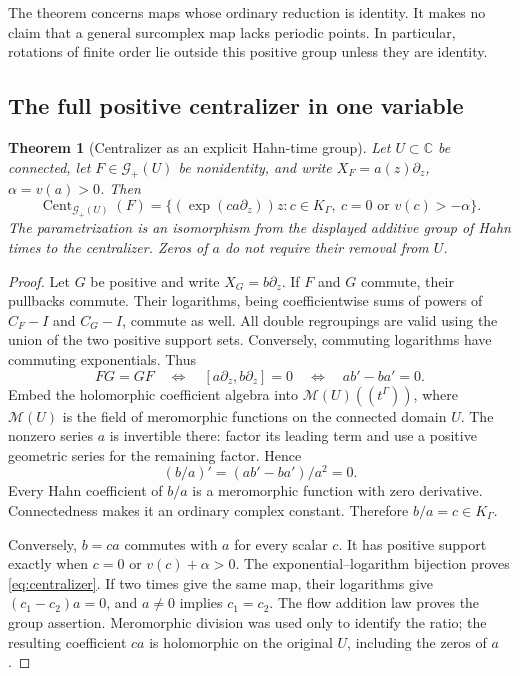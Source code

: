 \documentclass[11pt,letterpaper]{article}
\newtheorem{theorem}{Theorem}[section]
\theoremstyle{definition}
\theoremstyle{remark}
\newcommand{\C}{\mathbb C}
\newcommand{\GG}{\mathscr G}
\newcommand{\Cent}{\operatorname{Cent}}
\numberwithin{equation}{section}
\begin{document}
The theorem concerns maps whose ordinary reduction is identity. It makes no
claim that a general surcomplex map lacks periodic points. In particular,
rotations of finite order lie outside this positive group unless they are
identity.

\subsection{The full positive centralizer in one variable}
\begin{theorem}[Centralizer as an explicit Hahn-time group]
\label{thm:centralizer}
Let $U\subset\C$ be connected, let $F\in\GG_+(U)$ be nonidentity, and
write $X_F=a(z)\partial_z$, $\alpha=v(a)>0$. Then
\begin{equation}\label{eq:centralizer}
 \Cent_{\GG_+(U)}(F)=
 \bigl\{(\exp(ca\partial_z))z:
        c\in K_\Gamma,\ c=0\text{ or }v(c)>-\alpha\bigr\}.
\end{equation}
The parametrization is an isomorphism from the displayed additive group of
Hahn times to the centralizer. Zeros of $a$ do not require their removal
from $U$.
\end{theorem}
\begin{proof}
Let $G$ be positive and write $X_G=b\partial_z$. If $F$ and $G$ commute,
their pullbacks commute. Their logarithms, being coefficientwise sums of
powers of $C_F-I$ and $C_G-I$, commute as well. All double regroupings are
valid using the union of the two positive support sets. Conversely, commuting
logarithms have commuting exponentials. Thus
\[
 FG=GF\quad\Longleftrightarrow\quad
 [a\partial_z,b\partial_z]=0
 \quad\Longleftrightarrow\quad ab'-ba'=0.
\]
Embed the holomorphic coefficient algebra into
$\mathcal M(U)((t^\Gamma))$, where $\mathcal M(U)$ is the field of
meromorphic functions on the connected domain $U$. The nonzero series $a$
is invertible there: factor its leading term and use a positive geometric
series for the remaining factor. Hence
\[
 (b/a)'=(ab'-ba')/a^2=0.
\]
Every Hahn coefficient of $b/a$ is a meromorphic function with zero
derivative. Connectedness makes it an ordinary complex constant. Therefore
$b/a=c\in K_\Gamma$.

Conversely, $b=ca$ commutes with $a$ for every scalar $c$. It has positive
support exactly when $c=0$ or $v(c)+\alpha>0$. The exponential--logarithm
bijection proves \eqref{eq:centralizer}. If two times give the same map,
their logarithms give $(c_1-c_2)a=0$, and $a\ne0$ implies $c_1=c_2$.
The flow addition law proves the group assertion. Meromorphic division was
used only to identify the ratio; the resulting coefficient $ca$ is
holomorphic on the original $U$, including the zeros of $a$.
\end{proof}
\end{document}
